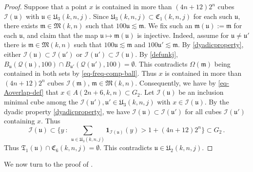 \documentclass[10pt,a4paper]{article}
\theoremstyle{plain}
\theoremstyle{definition}
\numberwithin{equation}{subsection}
\newcommand{\fu}{{\mathfrak u}}
\newcommand{\fU}{{\mathfrak U}}
\newcommand{\fC}{{\mathfrak C}}
\newcommand{\scI}{{\mathcal{I}}} %
\newcommand{\fcc}{{\mathcal{Q}}}
\newcommand{\leanok}{}
\begin{document}
\begin{proof}
    \leanok
    Suppose that a point $x$ is contained in more than $(4n + 12)2^n$ cubes $\scI(\fu)$ with $\fu \in \fU_3(k,n,j)$.
    Since $\fU_3(k,n,j) \subset \fC_1(k,n,j)$ for each such $\fu$,
    there exists $\mathfrak{m} \in \mathfrak{M}(k,n)$ such that $100\fu \lesssim \mathfrak{m}$.
    We fix such an $\mathfrak{m}(\fu) := \mathfrak{m}$ for each $\fu$, and claim that the map $\fu \mapsto\mathfrak{m}(\fu)$ is injective.
    Indeed, assume for $\fu\neq \fu'$ there is $\mathfrak{m} \in \mathfrak{M}(k,n)$ such that
    $100\fu \lesssim \mathfrak{m}$ and $100\fu' \lesssim \mathfrak{m}$. By \eqref{dyadicproperty},
    either $\scI(\fu) \subset \scI(\fu')$ or $\scI(\fu') \subset \scI(\fu)$.
    By \eqref{defunkj}, $B_{\fu}(\fcc(\fu),100) \cap B_{\fu'}(\fcc(\fu'), 100) = \emptyset$.
    This contradicts $\Omega(\mathfrak{m})$ being contained in both sets by \eqref{eq-freq-comp-ball}.
    Thus $x$ is contained in more than $(4n + 12)2^n$ cubes $\scI(\mathfrak{m})$, $\mathfrak{m} \in \mathfrak{M}(k,n)$.
    Consequently, we have by \eqref{eq-Aoverlap-def} that $x \in A(2n + 6, k,n) \subset G_2$.
    Let $\scI(\fu)$ be an inclusion minimal cube among the $\scI(\fu'), \fu' \in \fU_3(k,n,j)$ with $x \in \scI(\fu)$.
    By the dyadic property \eqref{dyadicproperty}, we have $\scI(\fu) \subset \scI(\fu')$ for all cubes $\scI(\fu')$ containing $x$. Thus
    $$
        \scI(\fu) \subset \{y \ : \ \sum_{\fu \in \fU_3(k,n,j)} \mathbf{1}_{\scI(\fu)}(y) > 1 + (4n+12)2^{n}\} \subset G_2\,.
    $$
    Thus $\mathfrak{T}_1(\fu) \cap \fC_6(k,n,j) = \emptyset$.
    This contradicts $\fu \in \fU_2(k,n,j)$.
\end{proof}
We now turn to the proof of .
\end{document}
